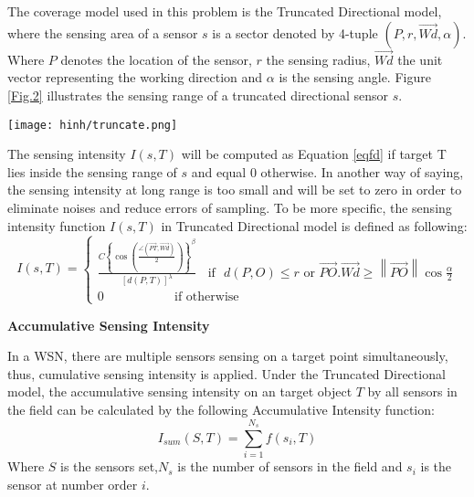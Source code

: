 \documentclass[final]{elsarticle}
\begin{document}
The coverage model used in this problem is the Truncated Directional model, where the sensing area of a sensor $ s $ is a sector denoted by 4-tuple $( P, r, \overrightarrow{Wd}, \alpha )$. Where $ P $ denotes the location of the sensor, $ r $ the sensing radius, $ \overrightarrow{Wd}$ the unit vector representing the working direction and $ \alpha $ is the sensing angle. Figure \ref{Fig.2} illustrates the sensing range of a truncated directional sensor $ s $. 
\begin{figure*}[h]
	\centering
	\texttt{[image: hinh/truncate.png]}
	\caption{Sensing capability of Truncated Directional sensor}
	\label{Fig.2}       %
\end{figure*}
The sensing intensity $I(s,T)$ will be computed as Equation \ref{eqfd} if target T lies inside the sensing range of $s$ and equal 0 otherwise. In another way of saying, the sensing intensity at long range is too small and will be set to zero in order to eliminate noises and reduce errors of sampling. To be more specific, the sensing intensity function $I(s,T)$ in Truncated Directional model is defined as following:
\begin{equation}
I({s},T) = \left\{
\begin{aligned}
 \frac {{C{{\left\{ {\cos \left( {\frac{{\angle (\overrightarrow {PT} ,\overrightarrow {Wd}) }}{2}} \right)} \right\}}}^\beta }} {{{{\left[ {d(P,T)} \right]}^\lambda }}} \:\:\:\:\text{if} \:\:\: d(P,O) \le r \text{ or } \overrightarrow {PO} .\overrightarrow {Wd}  \ge \left\| {\overrightarrow {PO} } \right\|\cos \frac{\alpha}{2} \\
 0 \:\:\:\:\:\:\:\:\:\:\:\:\:\:\:\:\:\:\:\:\:\:\:\:\:\text{if  otherwise}\:\:\:\:\:\:\:\:\:\:\:\:\:\:\:\:\:\:\:\:\:\:\:\:\:\:\:\:\:\:\:\:\:\:\:\:\:\:\:\:\:\:\:\:\:\:\:\:\:\:\:\:\:\:\:\:\:\:
\end{aligned}
\right.
\end{equation}

\noindent\textbf{Accumulative Sensing Intensity}

In a WSN, there are multiple sensors sensing on a target point simultaneously, thus, cumulative sensing intensity is applied. Under the Truncated Directional model, the accumulative sensing intensity on an target object $ T $ by all sensors in the field can be calculated by the following Accumulative Intensity function: 
\begin{equation}
\label{eqia}
I_{sum}(S, T) = \sum\limits_{i = 1}^{N_s} {f({s_i},T)} 
\end{equation}
Where $ S $ is the sensors set,$ N_s $ is the number of sensors in the field and $s_i$ is the sensor at number order $ i $.
\end{document}
